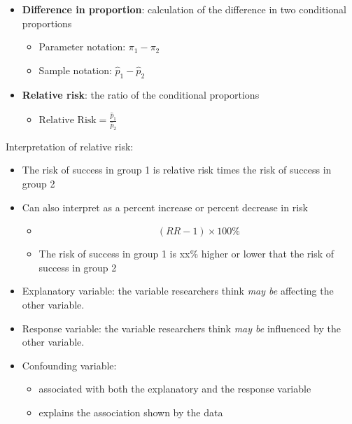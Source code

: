 \documentclass[
]{report}
\providecommand{\tightlist}{%
  \setlength{\itemsep}{0pt}\setlength{\parskip}{0pt}}
\begin{document}
\begin{itemize}
\item
  \textbf{Difference in proportion}: calculation of the difference in two conditional proportions

  \begin{itemize}
  \item
    Parameter notation: \(\pi_1 - \pi_2\)
  \item
    Sample notation: \(\hat{p}_1 - \hat{p}_2\)
  \end{itemize}
\item
  \textbf{Relative risk}: the ratio of the conditional proportions

  \begin{itemize}
  \tightlist
  \item
    \(\text{Relative Risk} = \frac{\hat{p}_1}{\hat{p}_2}\)
  \end{itemize}
\end{itemize}

Interpretation of relative risk:

\begin{itemize}
\item
  The risk of success in group 1 is relative risk times the risk of success in group 2
\item
  Can also interpret as a percent increase or percent decrease in risk

  \begin{itemize}
  \item
    \[(RR-1) \times 100\%\]
  \item
    The risk of success in group 1 is xx\% higher or lower that the risk of success in group 2
  \end{itemize}
\item
  Explanatory variable: the variable researchers think \emph{may be} affecting the other variable.
\item
  Response variable: the variable researchers think \emph{may be} influenced by the other variable.
\item
  Confounding variable:

  \begin{itemize}
  \tightlist
  \item
    associated with both the explanatory and the response variable
  \item
    explains the association shown by the data
  \end{itemize}
\end{itemize}
\end{document}
